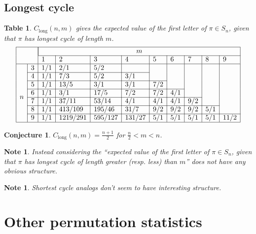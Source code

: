 \documentclass{article}
\newcommand{\n}[1]{\multicolumn{1}{|c|}{#1}}
\newtheorem{conjecture}[theo]{Conjecture}
\newtheorem{datatable}[theo]{Table}
\newtheorem{note}[theo]{Note}
\begin{document}
\subsection{Longest cycle}
\begin{datatable} $C_\text{long}(n, m)$ gives the expected value of the first letter of
  $\pi \in S_n$, given that $\pi$ has longest cycle of length $m$.
\[
  \begin{array}{|ll|l|l|l|l|l|l|l|l|l|}
  \hline
  & & \multicolumn{9}{|c|}{m} \\ \cline{3-11}
  & & 1 & 2 & 3 & 4 & 5 & 6 & 7 & 8 & 9 \\ \hline
  \multirow{8}{*}{$n$}
  & \n 3 & 1/1 & 2/1      & 5/2     &        &     &     &     &     &      \\ \cline{2-6}
  & \n 4 & 1/1 & 7/3      & 5/2     & 3/1    &     &     &     &     &      \\ \cline{2-7}
  & \n 5 & 1/1 & 13/5     & 3/1     & 3/1    & 7/2 &     &     &     &      \\ \cline{2-8}
  & \n 6 & 1/1 & 3/1      & 17/5    & 7/2    & 7/2 & 4/1 &     &     &      \\ \cline{2-9}
  & \n 7 & 1/1 & 37/11    & 53/14   & 4/1    & 4/1 & 4/1 & 9/2 &     &      \\ \cline{2-10}
  & \n 8 & 1/1 & 413/109  & 195/46  & 31/7   & 9/2 & 9/2 & 9/2 & 5/1 &      \\ \cline{2-11}
  & \n 9 & 1/1 & 1219/291 & 595/127 & 131/27 & 5/1 & 5/1 & 5/1 & 5/1 & 11/2 \\ \hline
  \end{array}
\]
\end{datatable}
\begin{conjecture}
  $\displaystyle C_\text{long}(n, m) = \frac{n + 1}{2} $ for $\frac n2 < m < n$.
\end{conjecture}
\begin{note}
  Instead considering the ``expected value of the first letter of $\pi \in S_n$,
  given that $\pi$ has longest cycle of length greater (resp. less) than $m$''
  does not have any obvious structure.
\end{note}
\begin{note}
  Shortest cycle analogs don't seem to have interesting structure.
\end{note}
\section{Other permutation statistics}
\end{document}
